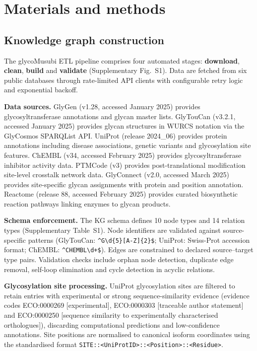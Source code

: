 \documentclass[11pt,a4paper]{article}
\begin{document}
\section{Materials and methods}

\subsection{Knowledge graph construction}

The glycoMusubi ETL pipeline comprises four automated stages: \textbf{download},
\textbf{clean}, \textbf{build} and \textbf{validate} (Supplementary Fig.~S1).
Data are fetched from six public databases through rate-limited API clients
with configurable retry logic and exponential backoff.

\textbf{Data sources.} GlyGen (v1.28, accessed January 2025) provides
glycosyltransferase annotations and glycan master lists. GlyTouCan (v3.2.1,
accessed January 2025) provides glycan structures in WURCS notation via the
GlyCosmos SPARQList API. UniProt (release 2024\_06) provides protein annotations
including disease associations, genetic variants and glycosylation site features.
ChEMBL (v34, accessed February 2025) provides glycosyltransferase inhibitor
activity data. PTMCode (v3) provides post-translational modification site-level
crosstalk network data. GlyConnect (v2.0, accessed March 2025) provides
site-specific glycan assignments with protein and position annotation. Reactome
(release 88, accessed February 2025) provides curated biosynthetic reaction
pathways linking enzymes to glycan products.

\textbf{Schema enforcement.} The KG schema defines 10 node types and 14
relation types (Supplementary Table~S1). Node identifiers are validated against
source-specific patterns (GlyTouCan: \texttt{\^{}G\textbackslash d\{5\}[A-Z]\{2\}\$};
UniProt: Swiss-Prot accession format; ChEMBL: \texttt{\^{}CHEMBL\textbackslash d+\$}).
Edges are constrained to declared source--target type pairs. Validation checks
include orphan node detection, duplicate edge removal, self-loop elimination
and cycle detection in acyclic relations.

\textbf{Glycosylation site processing.} UniProt glycosylation sites are
filtered to retain entries with experimental or strong sequence-similarity
evidence (evidence codes ECO:0000269 [experimental], ECO:0000303 [traceable
author statement] and ECO:0000250 [sequence similarity to experimentally
characterised orthologues]), discarding computational predictions and
low-confidence annotations. Site positions are normalised to canonical isoform
coordinates using the standardised format
\texttt{SITE::<UniProtID>::<Position>::<Residue>}.
\end{document}
